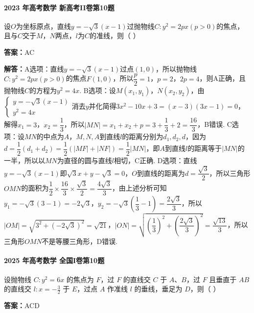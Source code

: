 \documentclass[UTF8,a4paper,11pt]{ctexart}
\begin{document}
\paragraph{2023 年高考数学 新高考II卷第10题}

设$O$为坐标原点，直线$y=-\sqrt{3}(x-1)$过抛物线$C:y^{2}=2px(p>0)$的焦点，且与$C$交于$M$，$N$两点，$l$为$C$的准线，则（ \quad ）

\textbf{答案：}AC\par

\textbf{解答：}A选项：直线$y=-\sqrt{3}(x-1)$过点$(1,0)$，所以抛物线$C:y^{2}=2px(p>0)$的焦点$F(1,0)$，所以$\dfrac{p}{2}=1$，$p=2$，$2p=4$，则A正确，且抛物线$C$的方程为$y^{2}=4x$.
B选项：设$M(x_{1},y_{1})$，$N(x_{2},y_{2})$，由$\begin{cases}y=-\sqrt{3}(x-1)\\ y^{2}=4x\end{cases}$消去$y$并化简得$3x^{2}-10x+3=(x-3)(3x-1)=0$，解得$x_{1}=3$，$x_{2}=\dfrac{1}{3}$，所以$|MN|=x_{1}+x_{2}+p=3+\dfrac{1}{3}+2=\dfrac{16}{3}$，B错误.
C选项：设$MN$的中点为$A$，$M,N,A$到直线$l$的距离分别为$d_{1},d_{2},d$，因为$d=\dfrac{1}{2}(d_{1}+d_{2})=\dfrac{1}{2}(|MF|+|NF|)=\dfrac{1}{2}|MN|$，即$A$到直线$l$的距离等于$|MN|$的一半，所以以$MN$为直径的圆与直线$l$相切，C正确.
D选项：直线$y=-\sqrt{3}(x-1)$即$\sqrt{3}x+y-\sqrt{3}=0$，$O$到直线的距离为$d=\dfrac{\sqrt{3}}{2}$，所以三角形$OMN$的面积为$\dfrac{1}{2}\times\dfrac{16}{3}\times\dfrac{\sqrt{3}}{2}=\dfrac{4\sqrt{3}}{3}$，由上述分析可知$y_{1}=-\sqrt{3}(3-1)=-2\sqrt{3}$，$y_{2}=-\sqrt{3}\left(\dfrac{1}{3}-1\right)=\dfrac{2\sqrt{3}}{3}$，所以$|OM|=\sqrt{3^{2}+(-2\sqrt{3})^{2}}=\sqrt{21}$，$|ON|=\sqrt{\left(\dfrac{1}{3}\right)^{2}+\left(\dfrac{2\sqrt{3}}{3}\right)^{2}}=\dfrac{\sqrt{13}}{3}$，所以三角形$OMN$不是等腰三角形，D错误.

\paragraph{2025 年高考数学 全国I卷第10题}

设抛物线 $C: y^2 = 6x$ 的焦点为 $F$，过 $F$ 的直线交 $C$ 于 $A$、$B$，过 $F$ 且垂直于 $AB$ 的直线交 $l: x = -\frac{3}{2}$ 于 $E$，过点 $A$ 作准线 $l$ 的垂线，垂足为 $D$，则（ ）

\textbf{答案：}ACD\par
\end{document}
